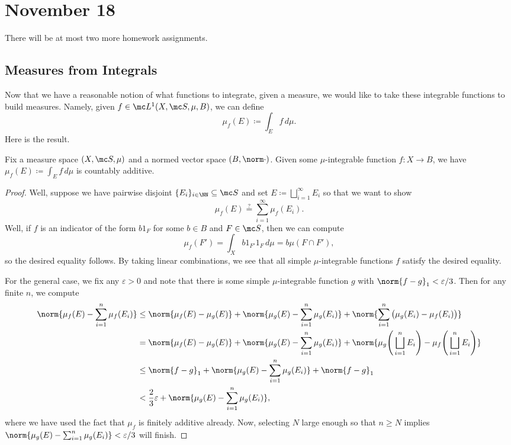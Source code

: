 \documentclass[../notes.tex]{subfiles}
\begin{document}
\section{November 18}

There will be at most two more homework assignments.

\subsection{Measures from Integrals}
Now that we have a reasonable notion of what functions to integrate, given a measure, we would like to take these integrable functions to build measures. Namely, given $f\in\mc L^1(X,\mc S,\mu,B)$, we can define
\[\mu_f(E)\coloneqq\int_Ef\,d\mu.\]
Here is the result.
\begin{proposition}
	Fix a measure space $(X,\mc S,\mu)$ and a normed vector space $(B,\norm\cdot)$. Given some $\mu$-integrable function $f\colon X\to B$, we have $\mu_f(E)\coloneqq\int_Ef\,d\mu$ is countably additive.
\end{proposition}
\begin{proof}
	Well, suppose we have pairwise disjoint $\{E_i\}_{i\in\NN}\subseteq\mc S$ and set $E\coloneqq\bigsqcup_{i=1}^\infty E_i$ so that we want to show
	\[\mu_f(E)\stackrel?=\sum_{i=1}^\infty\mu_f(E_i).\]
	Well, if $f$ is an indicator of the form $b1_F$ for some $b\in B$ and $F\in\mc S$, then we can compute
	\[\mu_f(F')=\int_Xb1_{F'}1_F\,d\mu=b\mu(F\cap F'),\]
	so the desired equality follows. By taking linear combinations, we see that all simple $\mu$-integrable functions $f$ satisfy the desired equality.

	For the general case, we fix any $\varepsilon>0$ and note that there is some simple $\mu$-integrable function $g$ with $\norm{f-g}_1<\varepsilon/3$. Then for any finite $n$, we compute
	\begin{align*}
		\norm{\mu_f(E)-\sum_{i=1}^n\mu_f(E_i)} &\le \norm{\mu_f(E)-\mu_g(E)} + \norm{\mu_g(E)-\sum_{i=1}^n\mu_g(E_i)}+\norm{\sum_{i=1}^n\big(\mu_g(E_i)-\mu_f(E_i)\big)} \\
		&= \norm{\mu_f(E)-\mu_g(E)}+\norm{\mu_g(E)-\sum_{i=1}^n\mu_g(E_i)}+\norm{\mu_g\Bigg(\bigsqcup_{i=1}^nE_i\Bigg)-\mu_f\Bigg(\bigsqcup_{i=1}^nE_i\Bigg)} \\
		&\le \norm{f-g}_1+\norm{\mu_g(E)-\sum_{i=1}^n\mu_g(E_i)}+\norm{f-g}_1 \\
		&< \frac23\varepsilon+\norm{\mu_g(E)-\sum_{i=1}^n\mu_g(E_i)},
	\end{align*}
	where we have used the fact that $\mu_f$ is finitely additive already. Now, selecting $N$ large enough so that $n\ge N$ implies $\norm{\mu_g(E)-\sum_{i=1}^n\mu_g(E_i)}<\varepsilon/3$ will finish.
\end{proof}
\end{document}
